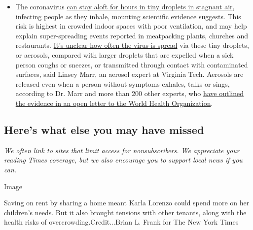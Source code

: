 \begin{itemize}
  \begin{itemize}
  \tightlist
  \item
    The coronavirus
    \href{https://www.nytimes.com/2020/07/04/health/239-experts-with-one-big-claim-the-coronavirus-is-airborne.html?action=click\&pgtype=Article\&state=default\&region=MAIN_CONTENT_3\&context=storylines_faq}{can
    stay aloft for hours in tiny droplets in stagnant air}, infecting
    people as they inhale, mounting scientific evidence suggests. This
    risk is highest in crowded indoor spaces with poor ventilation, and
    may help explain super-spreading events reported in meatpacking
    plants, churches and restaurants.
    \href{https://www.nytimes.com/2020/07/06/health/coronavirus-airborne-aerosols.html?action=click\&pgtype=Article\&state=default\&region=MAIN_CONTENT_3\&context=storylines_faq}{It's
    unclear how often the virus is spread} via these tiny droplets, or
    aerosols, compared with larger droplets that are expelled when a
    sick person coughs or sneezes, or transmitted through contact with
    contaminated surfaces, said Linsey Marr, an aerosol expert at
    Virginia Tech. Aerosols are released even when a person without
    symptoms exhales, talks or sings, according to Dr. Marr and more
    than 200 other experts, who
    \href{https://academic.oup.com/cid/article/doi/10.1093/cid/ciaa939/5867798}{have
    outlined the evidence in an open letter to the World Health
    Organization}.
  \end{itemize}
\end{itemize}

\hypertarget{heres-what-else-you-may-have-missed}{%
\subsection{Here's what else you may have
missed}\label{heres-what-else-you-may-have-missed}}

\emph{We often link to sites that limit access for nonsubscribers. We
appreciate your reading Times coverage, but we also encourage you to
support local news if you can.}

Image

Saving on rent by sharing a home meant Karla Lorenzo could spend more on
her children's needs. But it also brought tensions with other tenants,
along with the health risks of overcrowding.Credit...Brian L. Frank for
The New York Times

